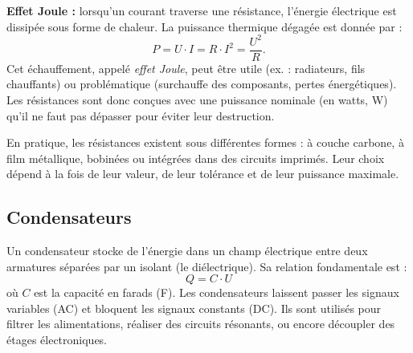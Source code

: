 \textbf{Effet Joule :} lorsqu’un courant traverse une résistance, l’énergie
électrique est dissipée sous forme de chaleur. La puissance thermique dégagée
est donnée par :
\[
P = U \cdot I = R \cdot I^2 = \frac{U^2}{R}.
\]
Cet échauffement, appelé \emph{effet Joule}, peut être utile (ex. : radiateurs,
fils chauffants) ou problématique (surchauffe des composants, pertes énergétiques).
Les résistances sont donc conçues avec une puissance nominale (en watts, \unit{\watt})
qu’il ne faut pas dépasser pour éviter leur destruction.

En pratique, les résistances existent sous différentes formes :
à couche carbone, à film métallique, bobinées ou intégrées dans des circuits imprimés.
Leur choix dépend à la fois de leur valeur, de leur tolérance et de leur puissance maximale.

\subsection{Condensateurs} \label{subsec:capacitors}
Un condensateur stocke de l’énergie dans un champ électrique
entre deux armatures séparées par un isolant (le diélectrique).
Sa relation fondamentale est :
\[
Q = C \cdot U
\]
où \(C\) est la capacité en farads (\unit{\farad}).
Les condensateurs laissent passer les signaux variables (AC)
et bloquent les signaux constants (DC).
Ils sont utilisés pour filtrer les alimentations,
réaliser des circuits résonants, ou encore découpler des étages électroniques.

